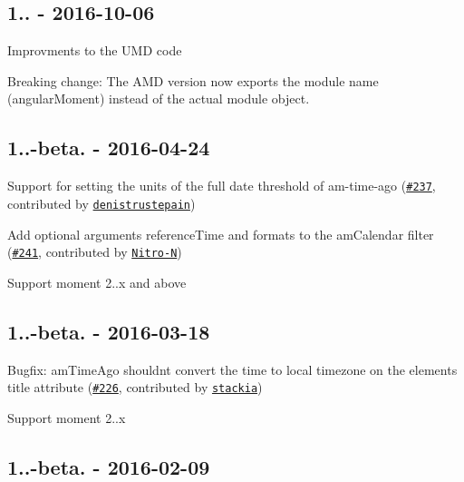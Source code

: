 \subsection*{1.. -\/ 2016-\/10-\/06}


\begin{DoxyItemize}
\item Improvments to the U\+MD code
\end{DoxyItemize}

Breaking change\+: The A\+MD version now exports the module name (\textquotesingle{}angular\+Moment\textquotesingle{}) instead of the actual module object.

\subsection*{1..-\/beta. -\/ 2016-\/04-\/24}


\begin{DoxyItemize}
\item Support for setting the units of the full date threshold of {\ttfamily am-\/time-\/ago} (\href{https://github.com/urish/angular-moment/pull/237}{\tt \#237}, contributed by \href{https://github.com/denistrustepain}{\tt denistrustepain})
\item Add optional arguments {\ttfamily reference\+Time} and {\ttfamily formats} to the {\ttfamily am\+Calendar} filter (\href{https://github.com/urish/angular-moment/pull/241}{\tt \#241}, contributed by \href{https://github.com/Nitro-N}{\tt Nitro-\/N})
\item Support moment 2..\+x and above
\end{DoxyItemize}

\subsection*{1..-\/beta. -\/ 2016-\/03-\/18}


\begin{DoxyItemize}
\item Bugfix\+: {\ttfamily am\+Time\+Ago} shouldn\textquotesingle{}t convert the time to local timezone on the element\textquotesingle{}s {\ttfamily title} attribute (\href{https://github.com/urish/angular-moment/pull/226}{\tt \#226}, contributed by \href{https://github.com/stackia}{\tt stackia})
\item Support moment 2..\+x
\end{DoxyItemize}

\subsection*{1..-\/beta. -\/ 2016-\/02-\/09}


